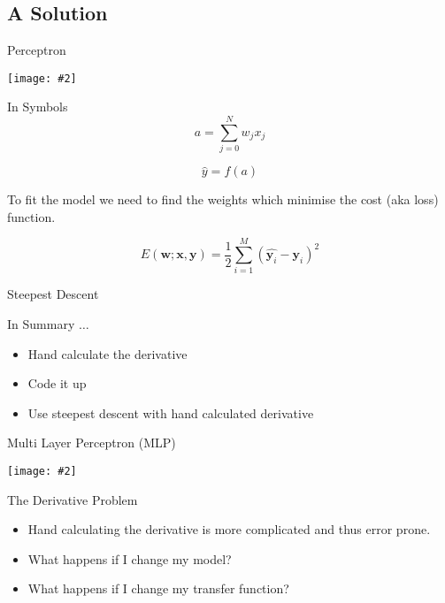 \documentclass{beamer}
\newcommand {\framedgraphic}[2] {
    \begin{frame}{#1}
        \begin{center}
            \texttt{[image: \#2]}
        \end{center}
    \end{frame}
}
\begin{document}
\subsection{A Solution}

\framedgraphic{Perceptron}{diagrams/Fita1.png}

\begin{frame}[fragile]{In Symbols}
$$
a = \sum_{j=0}^{N} w_{j} x_j
$$

$$
\hat{y} = f(a)
$$

To fit the model we need to find the weights which minimise the cost
(aka loss) function.

$$
E(\boldsymbol{w}; \boldsymbol{x}, \boldsymbol{y}) =
\frac{1}{2}\sum_{i=1}^M(\hat{\boldsymbol{y}_i} - \boldsymbol{y}_i)^2
$$
\end{frame}

\begin{frame}[fragile]{Steepest Descent}

\end{frame}

\begin{frame}[fragile]{In Summary $\ldots$}
\begin{itemize}
\item Hand calculate the derivative
\item Code it up
\item Use steepest descent with hand calculated derivative
\end{itemize}
\end{frame}

\framedgraphic{Multi Layer Perceptron (MLP)}{diagrams/Fita2.png}

\begin{frame}[fragile]{The Derivative Problem}
\begin{itemize}
\item Hand calculating the derivative is more complicated and thus error prone.
\item What happens if I change my model?
\item What happens if I change my transfer function?
\end{itemize}
\end{frame}
\end{document}
